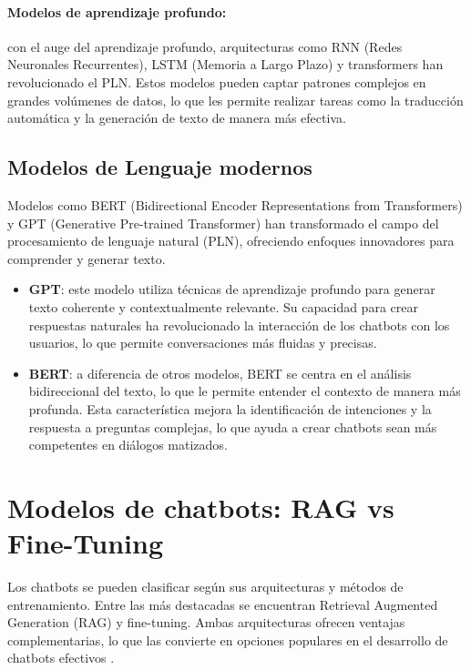   \paragraph{Modelos de aprendizaje profundo:} con el auge del aprendizaje profundo, arquitecturas como RNN (Redes Neuronales Recurrentes), LSTM (Memoria a Largo Plazo) y transformers han revolucionado el PLN. Estos modelos pueden captar patrones complejos en grandes volúmenes de datos, lo que les permite realizar tareas como la traducción automática y la generación de texto de manera más efectiva.
  

  \subsection{Modelos de Lenguaje modernos}

  Modelos como BERT (Bidirectional Encoder Representations from Transformers) y GPT (Generative Pre-trained Transformer) han transformado el campo del procesamiento de lenguaje natural (PLN), ofreciendo enfoques innovadores para comprender y generar texto.
  
  \begin{itemize}
	  \item \textbf{GPT}: este modelo utiliza técnicas de aprendizaje profundo para generar texto coherente y contextualmente relevante. Su capacidad para crear respuestas naturales ha revolucionado la interacción de los chatbots con los usuarios, lo que permite conversaciones más fluidas y precisas.
  
	  \item \textbf{BERT}: a diferencia de otros modelos, BERT se centra en el análisis bidireccional del texto, lo que le permite entender el contexto de manera más profunda. Esta característica mejora la identificación de intenciones y la respuesta a preguntas complejas, lo que ayuda a crear chatbots sean más competentes en diálogos matizados.
  \end{itemize}
  

  \section{Modelos de chatbots: RAG vs Fine-Tuning}
  
  Los chatbots se pueden clasificar según sus arquitecturas y métodos de entrenamiento. Entre las más destacadas se encuentran Retrieval Augmented Generation (RAG) y fine-tuning. Ambas arquitecturas ofrecen ventajas complementarias, lo que las convierte en opciones populares en el desarrollo de chatbots efectivos \cite{greyling2023}.



